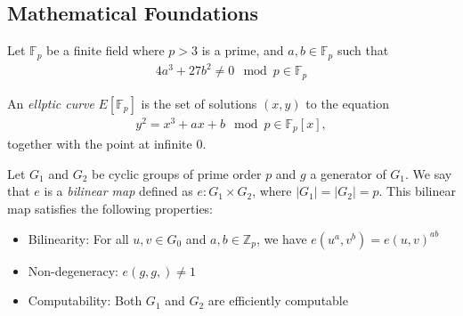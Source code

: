 \documentclass{sig-alternate}
\newenvironment{definition}[1][Definition]{\begin{trivlist}
\item[\hskip \labelsep {\bfseries #1}]}{\end{trivlist}}
\begin{document}
\subsection{Mathematical Foundations}
\begin{definition}
Let $\mathbb{F}_p$ be a finite field where $p > 3$ is a prime, and $a, b \in \mathbb{F}_p$ such that
\begin{align*}
4a^3 + 27b^2 \not= 0 \mod p \in \mathbb{F}_p
\end{align*}

An \emph{ellptic curve} $E[\mathbb{F}_p]$ is the set of solutions $(x, y)$ to the equation
\begin{align*}
y^2 = x^3 + ax + b \mod p \in \mathbb{F}_p[x],
\end{align*}
together with the point at infinite $0$.
\end{definition}

\begin{definition}
Let $G_1$ and $G_2$ be cyclic groups of prime order $p$ and $g$ a generator of $G_1$. We say that $e$ is a \emph{bilinear map} defined as $e : G_1 \times G_2$, where $|G_1| = |G_2| = p$. This bilinear map satisfies the following properties:
\begin{itemize}
	\item Bilinearity: For all $u, v \in G_0$ and $a, b \in \mathbb{Z}_p$, we have $e(u^a, v^b) = e(u,v)^{ab}$
	\item Non-degeneracy: $e(g, g,) \not= 1$
	\item Computability: Both $G_1$ and $G_2$ are efficiently computable
\end{itemize}
\end{definition}
\end{document}
